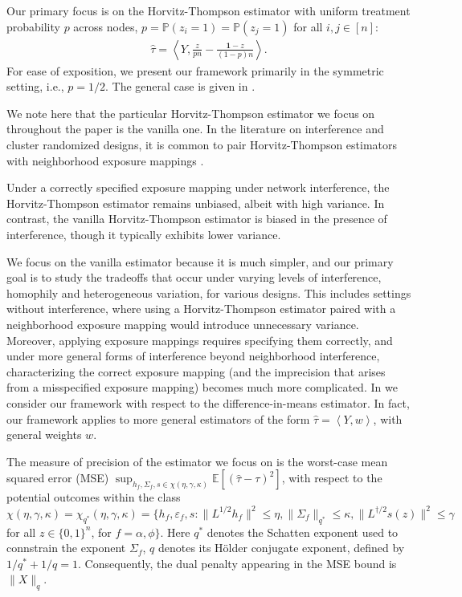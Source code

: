 \documentclass[12pt]{article}
\theoremstyle{definition}
\numberwithin{equation}{section}
\numberwithin{figure}{section}
\newcommand\dotp[1]{\left\langle #1 \right\rangle}
\numberwithin{equation}{section}
\numberwithin{figure}{section}
\begin{document}
Our primary focus is on the Horvitz-Thompson estimator with uniform treatment probability $p$ across nodes, $p = \mathbb{P}(z_i = 1) = \mathbb{P}(z_j = 1)$ for all $i,j \in [n]$:
\begin{align*}
    \hat{\tau} = \dotp{Y, \frac{z}{p n} - \frac{\mathbf{1}-z}{(1-p)n}}.
\end{align*}
For ease of exposition, we present our framework primarily in the symmetric setting, i.e., $p =1/2$. The general case is given in .

We note here that the particular Horvitz-Thompson estimator we focus on throughout the paper is the vanilla one. In the literature on interference and cluster randomized designs, it is common to pair Horvitz-Thompson estimators with neighborhood exposure mappings  \citep{aronow2017estimating, ugander2013graph, leung2022rate, thiyageswaran2024data, eichhorn2024low}.

Under a correctly specified exposure mapping under network interference, the Horvitz-Thompson estimator remains unbiased, albeit with high variance. In contrast, the vanilla Horvitz-Thompson estimator is biased in the presence of interference, though it typically exhibits lower variance. 

We focus on the vanilla estimator because it is much simpler, and our primary goal is to study the tradeoffs that occur under varying levels of interference, homophily and heterogeneous variation, for various designs. This includes settings without interference, where using a Horvitz-Thompson estimator paired with a neighborhood exposure mapping would introduce unnecessary variance. Moreover, applying exposure mappings requires specifying them correctly, and under more general forms of interference beyond neighborhood interference, characterizing the correct exposure mapping (and the imprecision that arises from a misspecified exposure mapping) becomes much more complicated. In  we consider our framework with respect to the difference-in-means estimator. In fact, our framework applies to more general estimators of the form $\hat{\tau} = \dotp{Y, w}$, with general weights $w$.

The measure of precision of the estimator we focus on is the worst-case mean squared error (MSE) $\sup_{h_f, \Sigma_f, s \in \chi(\eta, \gamma, \kappa)} \mathbb{E}[(\hat{\tau} - \tau)^2]$, with respect to the potential outcomes within the class $\chi(\eta, \gamma, \kappa) = \chi_{q^*}(\eta, \gamma, \kappa) = \{h_f, \varepsilon_f, s: \|L^{1/2} h_f\|^2 \leq \eta, \|\Sigma_f\|_{q^*}\leq \kappa, \|L^{\dagger/2} s(z)\|^2 \leq \gamma$ for all $z\in \{0,1\}^n$, for $f = \alpha, \phi \}$. Here $q^*$ denotes the Schatten exponent used to connstrain the exponent $\Sigma_f$, $q$ denotes its Hölder conjugate exponent, defined by $1/{q^*} + 1/q = 1$. Consequently, the dual penalty appearing in the MSE bound is $\| X \|_q$.
\end{document}
